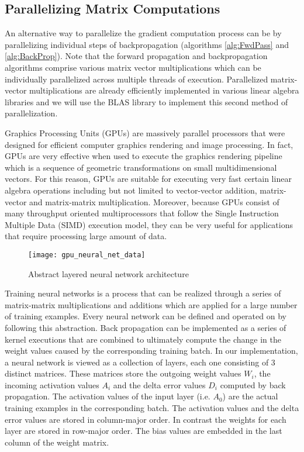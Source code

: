 \subsection{Parallelizing Matrix Computations}

An alternative way to parallelize the gradient computation process can be by parallelizing individual steps of backpropagation (algorithms \ref{alg:FwdPass} and \ref{alg:BackProp}).
Note that the forward propagation and backpropagation algorithms comprise various matrix vector multiplications which can be individually parallelized across multiple threads of execution.
Parallelized matrix-vector multiplications are already efficiently implemented in various linear algebra libraries and we will use the BLAS library to implement this second method of parallelization.

Graphics Processing Units (GPUs) are massively parallel processors that were designed for efficient computer graphics rendering and image processing. In fact, GPUs are very effective when used to execute the graphics rendering pipeline which is a sequence of geometric transformations on small multidimensional vectors. For this reason, GPUs are suitable for executing very fast certain linear algebra operations including but not limited to vector-vector addition, matrix-vector and matrix-matrix multiplication. Moreover, because GPUs consist of many throughput oriented multiprocessors that follow the Single Instruction Multiple Data (SIMD) execution model, they can be very useful for applications that require processing large amount of data.

\begin{figure}[ht]
\begin{center}
\centerline{\texttt{[image: gpu\_neural\_net\_data]}}
\caption{Abstract layered neural network architecture}
\label{fig:nn_architecture}
\end{center}
\vskip -0.2in
\end{figure}

Training neural networks is a process that can be realized through a series of matrix-matrix multiplications and additions which are applied for a large number of training examples. Every neural network can be defined and operated on by following this abstraction. Back propagation can be implemented as a series of kernel executions that are combined to ultimately compute the change in the weight values caused by the corresponding training batch. In our implementation, a neural network is viewed as a collection of layers, each one consisting of 3 distinct matrices. These matrices store the outgoing weight values $W_i$, the incoming activation values $A_i$ and the delta error values $D_i$ computed by back propagation. The activation values of the input layer (i.e. $A_0$) are the actual training examples in the corresponding batch. The activation values and the delta error values are stored in column-major order. In contrast the weights for each layer are stored in row-major order. The bias values are embedded in the last column of the weight matrix.

